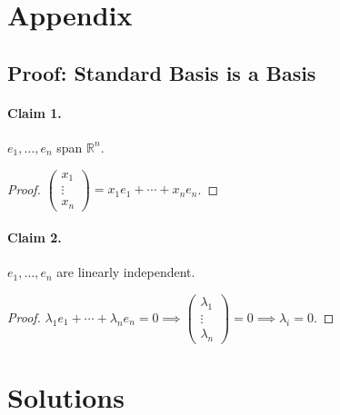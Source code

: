 \documentclass{article}
\begin{document}
\section{Appendix}

\subsection{Proof: Standard Basis is a Basis}
\label{subsec:SB}
\paragraph{Claim 1.} $e_1,\ldots,e_n$ span $\mathbb{R}^n$.
\begin{proof}
    $\begin{pmatrix}x_1\\\vdots\\x_n\end{pmatrix} = x_1e_1+\cdots+x_ne_n$.
\end{proof}
\paragraph{Claim 2.} $e_1,\ldots,e_n$ are linearly independent.
\begin{proof}
    $\lambda_1e_1+\cdots+\lambda_ne_n=0 \implies \begin{pmatrix}\lambda_1\\\vdots\\\lambda_n\end{pmatrix}=0 \implies \lambda_i=0$.
\end{proof}

\section{Solutions}
\end{document}
